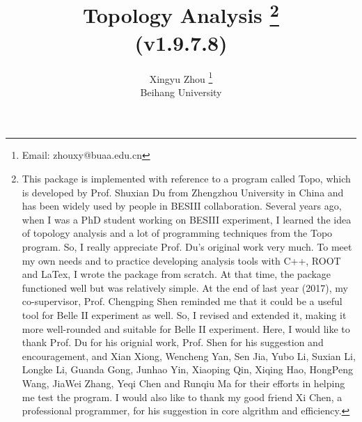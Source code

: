 \documentclass[landscape]{article}
\begin{document}
\title{Topology Analysis \footnote{\normalsize{This package is implemented with reference to a program called {\sc Topo}, which is developed by Prof. Shuxian Du from Zhengzhou University in China and has been widely used by people in BESIII collaboration. Several years ago, when I was a PhD student working on BESIII experiment, I learned the idea of topology analysis and a lot of programming techniques from the {\sc Topo} program. So, I really appreciate Prof. Du's original work very much. To meet my own needs and to practice developing analysis tools with C++, ROOT and LaTex, I wrote the package from scratch. At that time, the package functioned well but was relatively simple. At the end of last year (2017), my co-supervisor, Prof. Chengping Shen reminded me that it could be a useful tool for Belle II experiment as well. So, I revised and extended it, making it more well-rounded and suitable for Belle II experiment. Here, I would like to thank Prof. Du for his orignial work, Prof. Shen for his suggestion and encouragement, and Xian Xiong, Wencheng Yan, Sen Jia, Yubo Li, Suxian Li, Longke Li, Guanda Gong, Junhao Yin, Xiaoping Qin, Xiqing Hao, HongPeng Wang, JiaWei Zhang, Yeqi Chen and Runqiu Ma for their efforts in helping me test the program. I would also like to thank my good friend Xi Chen, a professional programmer, for his suggestion in core algrithm and efficiency.}} \\ \vspace{0.1cm} \Large{(v1.9.7.8)}}
\author{Xingyu Zhou \footnote{\normalsize{Email: zhouxy@buaa.edu.cn}} \\ \vspace{0.1cm} Beihang University}
\maketitle

\clearpage


\listoftables


\clearpage
\end{document}
